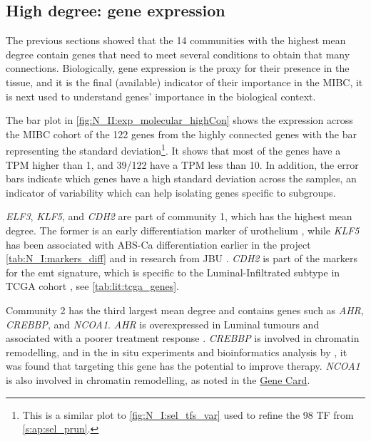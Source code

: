\subsection{High degree: gene expression} \label{s:N_II:high_ge}

The previous sections showed that the 14 communities with the highest mean degree contain genes that need to meet several conditions to obtain that many connections. Biologically, gene expression is the proxy for their presence in the tissue, and it is the final (available) indicator of their importance in the MIBC, it is next used to understand genes' importance in the biological context.

The bar plot in \cref{fig:N_II:exp_molecular_highCon} shows the expression across the MIBC cohort of the 122 genes from the highly connected genes with the bar representing the standard deviation\footnote{This is a similar plot to \cref{fig:N_I:sel_tfs_var} used to refine the  98 TF from \cref{s:ap:sel_prun}.}. It shows that most of the genes have a TPM higher than 1, and 39/122 have a TPM less than 10. In addition, the error bars indicate which genes have a high standard deviation across the samples, an indicator of variability which can help isolating genes specific to subgroups. 



\textit{ELF3}, \textit{KLF5}, and \textit{CDH2} are part of community 1, which has the highest mean degree. The former is an early differentiation marker of urothelium \citep{Bock2014-zy}, while \textit{KLF5} has been associated with ABS-Ca differentiation earlier in the project \cref{tab:N_I:markers_diff} and in research from JBU \citet{Bock2014-zy}. \textit{CDH2} is part of the markers for the \acrfull{emt} signature, which is specific to the Luminal-Infiltrated subtype in TCGA cohort \citep{Robertson2017-mg}, see \cref{tab:lit:tcga_genes}.

Community 2 has the third largest mean degree and contains genes such as \textit{AHR}, \textit{CREBBP}, and \textit{NCOA1}. \textit{AHR} is overexpressed in Luminal tumours \citep{Shi2020-km} and associated with a poorer treatment response \citep{Ma2023-uu}. \textit{CREBBP} is involved in chromatin remodelling, and in the in situ experiments and bioinformatics analysis by \citep{Duex2018-qg}, it was found that targeting this gene has the potential to improve therapy. \textit{NCOA1} is also involved in chromatin remodelling, as noted in the \href{https://www.uniprot.org/uniprotkb/Q15788/entry#function}{Gene Card}.

